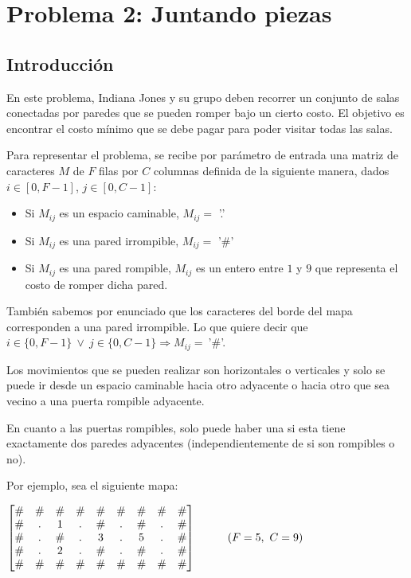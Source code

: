 \section{Problema 2: Juntando piezas}

\subsection{Introducción}

En este problema, Indiana Jones y su grupo deben recorrer un conjunto de salas conectadas por paredes que se pueden romper bajo un cierto costo. El objetivo es encontrar el costo mínimo que se debe pagar para poder visitar todas las salas.

Para representar el problema, se recibe por parámetro de entrada una matriz de caracteres $M$ de $F$ filas por $C$ columnas definida de la siguiente manera, dados $i \in [0,F-1]$, $j \in [0,C-1]$:

\begin{itemize}
	\item Si $M_{ij}$ es un espacio caminable, $M_{ij} = $ '.'
	\item Si $M_{ij}$ es una pared irrompible, $M_{ij} = $ '$\#$'
	\item Si $M_{ij}$ es una pared rompible, $M_{ij}$ es un entero entre $1$ y $9$ que representa el costo de romper dicha pared.
\end{itemize}

También sabemos por enunciado que los caracteres del borde del mapa corresponden a una pared irrompible. Lo que quiere decir que $i \in \{0, F-1\} \ \vee \ j \in \{0, C-1\} \Rightarrow M_{ij} =\ $'$\#$'.

Los movimientos que se pueden realizar son horizontales o verticales y solo se puede ir desde un espacio caminable hacia otro adyacente o hacia otro que sea vecino a una puerta rompible adyacente.

En cuanto a las puertas rompibles, solo puede haber una si esta tiene exactamente dos paredes adyacentes (independientemente de si son rompibles o no).

Por ejemplo, sea el siguiente mapa:
\\
    \begin{center}
    $   \begin{bmatrix}
           \# & \# & \# & \# & \# & \# & \# & \# & \# \\
           \# & . & 1 & . & \# & . & \# & . & \# \\
           \# & . & \# & . & 3 & . & 5 & . & \# \\
           \# & . & 2 & . & \# & . & \# & . & \# \\
           \# & \# & \# & \# & \# & \# & \# & \# & \# \\
       \end{bmatrix}
       \kern 1cm
       (F = 5,\ C = 9)$
 
   \end{center}

